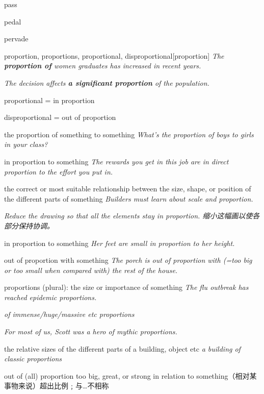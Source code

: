\begin{word}{pass}
\end{word}

\begin{word}{pedal}
\end{word}

\begin{word}{pervade}
\end{word}

\begin{word}{proportion, proportions, proportional, disproportional}[proportion]
    \textit{The \textbf{proportion of} women graduates has increased in recent years.}

    \textit{The decision affects \textbf{a significant proportion} of the population.}

    proportional = in proportion

    disproportional = out of proportion


the proportion of something to something
\textit{What’s the proportion of boys to girls in your class?}

in proportion to something
\textit{The rewards you get in this job are in direct proportion to the effort you put in.}

the correct or most suitable relationship between the size, shape, or position of the different parts of something
\textit{Builders must learn about scale and proportion.}

\textit{Reduce the drawing so that all the elements stay in proportion. 缩小这幅画以使各部分保持协调。}

in proportion to something
\textit{Her feet are small in proportion to her height.}

out of proportion with something
\textit{The porch is out of proportion with (=too big or too small when compared with) the rest of the house.}

proportions (plural):
the size or importance of something
\textit{The flu outbreak has reached epidemic proportions.}

\textit{of immense/huge/massive etc proportions}

\textit{For most of us, Scott was a hero of mythic proportions.}

the relative sizes of the different parts of a building, object etc
\textit{a building of classic proportions}

out of (all) proportion too big, great, or strong in relation to something（相对某事物来说）超出比例﹔与…不相称


\end{word}
